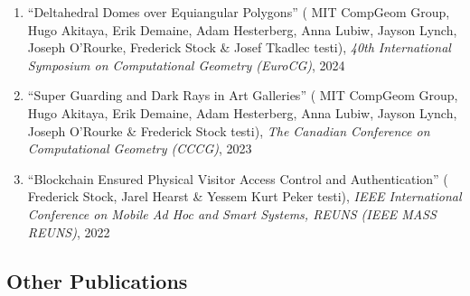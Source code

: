 \documentclass[letterpaper,11pt]{article}
\makeatletter
\newcommand{\resumeSubHeadingListStart}{\begin{itemize}[leftmargin=*]}
\newcommand{\resumeSubHeadingListEnd}{\end{itemize}}
\newcommand{\publication}[6]{
  \item ``#1'' %
   (\ignorespaces#2 testi), %
     \emph{#3}, %
      #4%


}
\newcommand{\pdficon}{\faFilePdf}
\newcommand{\doilabel}{\texttt{DOI}}
\makeatother
\begin{document}
\begin{enumerate}
        \publication
          {Deltahedral Domes over Equiangular Polygons}
          {
 MIT CompGeom Group, Hugo Akitaya, Erik Demaine, Adam Hesterberg, Anna Lubiw, Jayson Lynch, Joseph O'Rourke, Frederick Stock \& Josef Tkadlec}
          {40th International Symposium on Computational Geometry (EuroCG)}
          {2024}
          {%
\href{fred-stock.github.io/docstore/Domes-Over-Polygons-EuroCG.pdf}{\pdficon}%
%
\quad\href{https://doi.org/10.48550/arXiv.2408.04687}{\doilabel}%
          }
          {11}
 \vspace{-.5em}  
      
        \publication
          {Super Guarding and Dark Rays in Art Galleries}
          {
 MIT CompGeom Group, Hugo Akitaya, Erik Demaine, Adam Hesterberg, Anna Lubiw, Jayson Lynch, Joseph O'Rourke \& Frederick Stock}
          {The Canadian Conference on Computational Geometry (CCCG)}
          {2023}
          {%
\href{fred-stock.github.io/docstore/DarkRaysAG-CCCG.pdf}{\pdficon}%
%
%
          }
          {12}
 \vspace{-.5em}  
      
        \publication
          {Blockchain Ensured Physical Visitor Access Control and Authentication}
          {
 Frederick Stock, Jarel Hearst \& Yessem Kurt Peker}
          {IEEE International Conference on Mobile Ad Hoc and Smart Systems, REUNS (IEEE MASS REUNS)}
          {2022}
          {%
\href{fred-stock.github.io/docstore/blockchain-accesscontrol-REUNS.pdf}{\pdficon}%
%
%
          }
          {13}
 
    \setcounter{pubnum}{\value{enumi}}
    \end{enumerate}
    \subsection*{Other Publications}%
  
\end{document}
